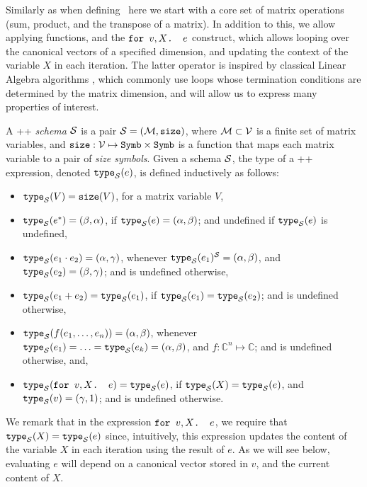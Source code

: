 \medskip

Similarly as when defining \lang\, here we start with a core set of matrix operations (sum, product, and the transpose of a matrix). In addition to this, we allow applying functions, and  the $\texttt{for }v,X \texttt{. }e$ construct, which allows looping over the canonical vectors of a specified dimension, and updating the context of the variable $X$ in each iteration. The latter operator is inspired by classical Linear Algebra algorithms \cite{num}, which commonly use loops whose termination conditions are determined by the matrix dimension, and will allow us to express many properties of interest.

A \lang++ {\em schema} $\mathcal{S}$ is a pair $\mathcal{S}=(\mathcal{M},\texttt{size})$, where $\mathcal{M}\subset \mathcal{V}$ is a finite set of matrix variables, and $\texttt{size}: \mathcal{V} \mapsto \texttt{Symb}\times \texttt{Symb}$ is a function that maps each matrix variable to a pair of {\em size symbols}. Given a schema $\mathcal{S}$, the type of a \lang++ expression, denoted $\texttt{type}_{\mathcal{S}}(e)$, is defined inductively as follows:
\begin{itemize}
\item $\texttt{type}_{\mathcal{S}}(V) = \texttt{size}(V)$, for a matrix variable $V$,
\item $\texttt{type}_{\mathcal{S}}(e^*) = (\beta,\alpha)$, if $\texttt{type}_{\mathcal{S}}(e)=(\alpha,\beta)$; and undefined if $\texttt{type}_{\mathcal{S}}(e)$ is undefined,
\item $\texttt{type}_{\mathcal{S}}(e_1 \cdot e_2) = (\alpha,\gamma)$, whenever $\texttt{type}_{\mathcal{S}}(e_1)^{\mathcal{S}}=(\alpha,\beta)$, and $\texttt{type}_{\mathcal{S}}(e_2)=(\beta,\gamma)$; and is undefined otherwise,
\item $\texttt{type}_{\mathcal{S}}(e_1 + e_2) = \texttt{type}_{\mathcal{S}}(e_1)$, if $\texttt{type}_{\mathcal{S}}(e_1) = \texttt{type}_{\mathcal{S}}(e_2)$; and is undefined otherwise,
\item $\texttt{type}_{\mathcal{S}}(f(e_1,\ldots ,e_n)) = (\alpha,\beta)$, whenever $\texttt{type}_{\mathcal{S}}(e_1) = \ldots = \texttt{type}_{\mathcal{S}}(e_k) = (\alpha,\beta)$, and $f:\mathbb{C}^n \mapsto  \mathbb{C}$; and is undefined otherwise, and,
\item $\texttt{type}_{\mathcal{S}}(\texttt{for }v,X \texttt{. }e) = \texttt{type}_{\mathcal{S}}(e)$, if $\texttt{type}_{\mathcal{S}}(X) = \texttt{type}_{\mathcal{S}}(e)$, and $\texttt{type}_{\mathcal{S}}(v) = (\gamma,1)$; and is undefined otherwise.
\end{itemize}

We remark that in the expression $\texttt{for }v,X \texttt{. }e$, we require that $\texttt{type}_{\mathcal{S}}(X) = \texttt{type}_{\mathcal{S}}(e)$ since, intuitively, this expression updates the content of the variable $X$ in each iteration using the result of $e$. As we will see below, evaluating $e$ will depend on a canonical vector stored in $v$, and the current content of $X$. %


